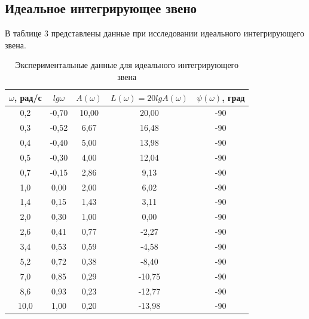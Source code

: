 \documentclass[12pt,a4paper]{article}
\begin{document}
\newpage
\begin{center}
\section{Идеальное интегрирующее звено}
\end{center}

В таблице 3 представлены данные при исследовании идеального интегрирующего звена.
\begin{table}[h!]
	\renewcommand{\arraystretch}{1.8} %
	\centering
	\begin{threeparttable}
	\caption{Экспериментальные данные для идеального интегрирующего звена}
	\begin{tabular}{|c|c|c|c|c|}
		\hline $\omega$, рад/с & $lg\omega$ & $A(\omega)$ & $L(\omega)=20lgA(\omega)$ & $\psi(\omega)$, град\\
		\hline 0,2 & -0,70 & 10,00 & 20,00 & -90\\
		\hline 0,3 & -0,52 & 6,67 & 16,48 & -90\\
		\hline 0,4 & -0,40 & 5,00 & 13,98 & -90\\
		\hline 0,5 & -0,30 & 4,00 & 12,04 & -90\\
		\hline 0,7 & -0,15 & 2,86 & 9,13 & -90\\
		\hline 1,0 & 0,00 & 2,00 & 6,02 & -90\\
		\hline 1,4 & 0,15 & 1,43 & 3,11 & -90\\
		\hline 2,0 & 0,30 & 1,00 & 0,00 & -90\\
		\hline 2,6 & 0,41 & 0,77 & -2,27 & -90\\
		\hline 3,4 & 0,53 & 0,59 & -4,58 & -90\\
		\hline 5,2 & 0,72 & 0,38 & -8,40 & -90\\
		\hline 7,0 & 0,85 & 0,29 & -10,75 & -90\\
		\hline 8,6 & 0,93 & 0,23 & -12,77 & -90\\
		\hline 10,0 & 1,00 & 0,20 & -13,98 & -90\\
		\hline
	\end{tabular}
	\end{threeparttable}
\end{table}
\end{document}
